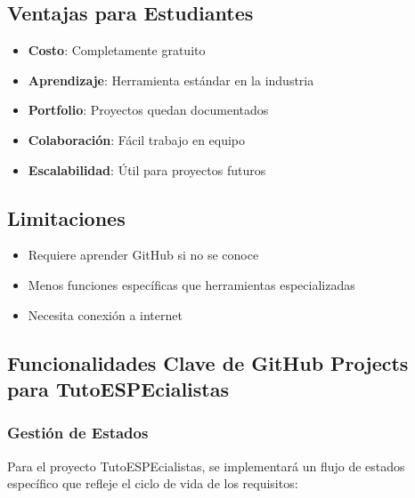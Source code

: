 \documentclass[12pt,a4paper]{article}
\begin{document}
\subsection{Ventajas para Estudiantes}

\begin{itemize}
    \item \textbf{Costo}: Completamente gratuito
    \item \textbf{Aprendizaje}: Herramienta estándar en la industria
    \item \textbf{Portfolio}: Proyectos quedan documentados
    \item \textbf{Colaboración}: Fácil trabajo en equipo
    \item \textbf{Escalabilidad}: Útil para proyectos futuros
\end{itemize}

\subsection{Limitaciones}

\begin{itemize}
    \item Requiere aprender GitHub si no se conoce
    \item Menos funciones específicas que herramientas especializadas
    \item Necesita conexión a internet
\end{itemize}

\subsection{Funcionalidades Clave de GitHub Projects para TutoESPEcialistas}

\subsubsection{Gestión de Estados}

Para el proyecto TutoESPEcialistas, se implementará un flujo de estados específico que refleje el ciclo de vida de los requisitos:
\end{document}
